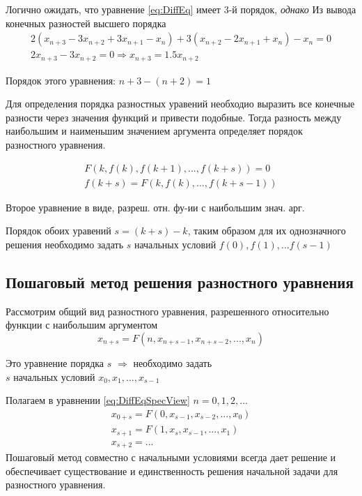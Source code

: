 \documentclass[a4paper,11pt]{article}
\begin{document}
  Логично ожидать, что уравнение \ref{eq:DiffEq} имеет 3-й порядок, \textit{однако}
  \marginpar
  {
    \footnotesize Из вывода конечных разностей высшего порядка
  }
  \begin{gather*}
    2(x_{n+3} - 3x_{n+2} + 3x_{n+1} - x_n) + 3(x_{n+2} - 2x_{n+1} + x_n) - x_n = 0 \\
    2x_{n+3} - 3x_{n+2} = 0 \Rightarrow x_{n+3} = 1.5x_{n+2}
  \end{gather*}
  \begin{center}
    Порядок этого уравнения: $ n+3 - (n+2) = 1$
  \end{center}
  \begin{importantblock}
    Для определения порядка разностных уравений необходио выразить все конечные разности через значения функций и привести подобные. Тогда разность между наибольшим и наименьшим значением аргумента определяет порядок разностного уравнения.
  \end{importantblock}
  \begin{gather*}
    F(k, f(k), f(k+1),..., f(k+s)) = 0 \\
    f(k+s)=F(k, f(k),..., f(k+s-1))
  \end{gather*}
  \begin{center}
    \small Второе уравнение в виде, разреш. отн. фу-ии с наибольшим знач. арг.\\
  \end{center}
  Порядок обоих уравений $s=(k+s)-k$, таким образом для их однозначного решения необходимо задать $s$ начальных условий $f(0),f(1),...f(s-1)$

  \subsection{Пошаговый метод решения разностного уравнения}
  Рассмотрим общий вид разностного уравнения, разрешенного относительно функции с наибольшим аргументом
  \begin{equation}
    x_{n+s} = F(n, x_{n+s-1},x_{n+s-2},..., x_n)
    \label{eq:DiffEqSpecView}
  \end{equation}
  \begin{center}
    Это уравнение порядка $s$ $\Rightarrow$ необходимо задать \\
    $s$ начальных условий $ x_0, x_1,..., x_{s-1} $
  \end{center}
  Полагаем в уравнении \ref{eq:DiffEqSpecView} $n=0, 1, 2, ...$
  \begin{gather*}
    x_{0+s} = F(0, x_{s-1},x_{s-2},..., x_0) \\
    x_{s+1} = F(1, x_s,x_{s-1},..., x_1) \\
    x_{s+2} = ...
  \end{gather*}
  Пошаговый метод совместно с начальными условиями всегда дает решение и обеспечивает существование и единственность решения начальной задачи для разностного уравнения.\\
\end{document}
